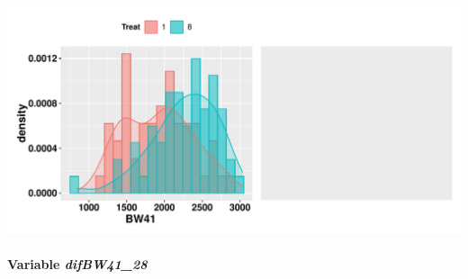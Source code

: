 \documentclass[
  11pt,
]{article}
\begin{document}
\includegraphics{def_files/figure-latex/unnamed-chunk-12-4.pdf}

\hypertarget{variable-difbw41_28}{%
\paragraph{\texorpdfstring{Variable
\emph{difBW41\_28}}{Variable difBW41\_28}}\label{variable-difbw41_28}}
\end{document}
